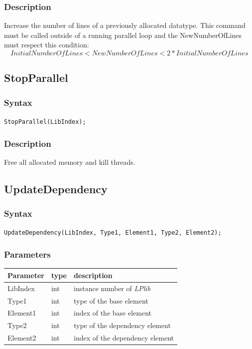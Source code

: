 \documentclass[a4paper,12pt]{article}
\begin{document}
\subsubsection*{Description}
Increase the number of lines of a previously allocated datatype. This command must be called outside of a running parallel loop and the NewNumberOfLines must respect this condition: $$ InitialNumberOfLines < NewNumberOfLines < 2*InitialNumberOfLines $$


\subsection{StopParallel}

\subsubsection*{Syntax}
\tt{StopParallel(LibIndex);}
\normalfont

\subsubsection*{Description}
Free all allocated memory and kill threads.


\subsection{UpdateDependency}

\subsubsection*{Syntax}
\tt{UpdateDependency(LibIndex, Type1, Element1, Type2, Element2);}
\normalfont

\subsubsection*{Parameters}

\begin{tabular}{|m{2cm}|m{1.5cm}|m{10.5cm}|}
\hline
Parameter  & type   & description \\
\hline
LibIndex   & int    & instance number of \emph{LPlib} \\
\hline
Type1      & int    & type of the base element \\
\hline
Element1   & int    & index of the base element \\
\hline
Type2      & int    & type of the dependency element \\
\hline
Element2   & int    & index of the dependency element \\
\hline
\end{tabular}
\end{document}

